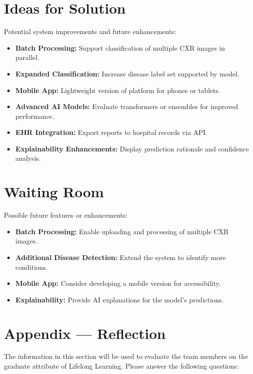 \documentclass[12pt]{article}
\begin{document}
\section{Ideas for Solution}
Potential system improvements and future enhancements:
\begin{itemize}
    \item \textbf{Batch Processing:} Support classification of multiple CXR images in parallel.
    \item \textbf{Expanded Classification:} Increase disease label set supported by model.
    \item \textbf{Mobile App:} Lightweight version of platform for phones or tablets.
    \item \textbf{Advanced AI Models:} Evaluate transformers or ensembles for improved performance.
    \item \textbf{EHR Integration:} Export reports to hospital records via API.
    \item \textbf{Explainability Enhancements:} Display prediction rationale and confidence analysis.
\end{itemize}

\section{Waiting Room}
Possible future features or enhancements:
\begin{itemize}
    \item \textbf{Batch Processing:} Enable uploading and processing of multiple CXR images.
    \item \textbf{Additional Disease Detection:} Extend the system to identify more conditions.
    \item \textbf{Mobile App:} Consider developing a mobile version for accessibility.
    \item \textbf{Explainability:} Provide AI explanations for the model's predictions.
\end{itemize}

\newpage{}
\section{Appendix --- Reflection}

The information in this section will be used to evaluate the team members on the
graduate attribute of Lifelong Learning. Please answer the following questions:
\end{document}
